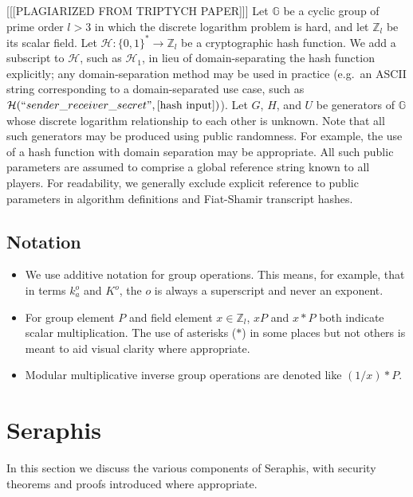 [[[PLAGIARIZED FROM TRIPTYCH PAPER]]] Let $\mathbb{G}$ be a cyclic group of prime order $l > 3$ in which the discrete logarithm problem is hard, and let $\mathbb{Z}_l$ be its scalar field. Let $\mathcal{H}: \{0,1\}^* \to \mathbb{Z}_l$ be a cryptographic hash function. We add a subscript to $\mathcal{H}$, such as $\mathcal{H}_1$, in lieu of domain-separating the hash function explicitly; any domain-separation method may be used in practice (e.g.\ an ASCII string corresponding to a domain-separated use case, such as $\mathcal{H}(``sender\_receiver\_secret",[\textrm{hash input}])$). Let $G$, $H$, and $U$ be generators of $\mathbb{G}$ whose discrete logarithm relationship to each other is unknown. Note that all such generators may be produced using public randomness. For example, the use of a hash function with domain separation may be appropriate. All such public parameters are assumed to comprise a global reference string known to all players. For readability, we generally exclude explicit reference to public parameters in algorithm definitions and Fiat-Shamir transcript hashes.


\subsection{Notation}
\label{subsec:preliminaries-notation}

\begin{itemize}
    \item We use additive notation for group operations. This means, for example, that in terms $k^o_a$ and $K^o$, the $o$ is always a superscript and never an exponent.

    \item For group element $P$ and field element $x \in \mathbb{Z}_l$, $x P$ and $x*P$ both indicate scalar multiplication. The use of asterisks ($*$) in some places but not others is meant to aid visual clarity where appropriate.

    \item Modular multiplicative inverse group operations are denoted like $(1/x)*P$.
\end{itemize}



\section{Seraphis}
\label{sec:seraphis}

In this section we discuss the various components of Seraphis, with security theorems and proofs introduced where appropriate.


